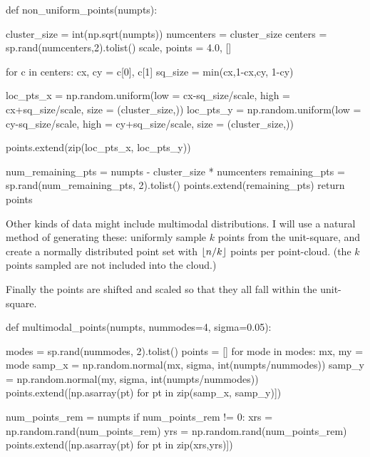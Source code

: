 def non_uniform_points(numpts):

    cluster_size = int(np.sqrt(numpts)) 
    numcenters   = cluster_size
    centers      = sp.rand(numcenters,2).tolist()
    scale, points = 4.0, []

    for c in centers:
        cx, cy = c[0], c[1]
        sq_size      = min(cx,1-cx,cy, 1-cy)

        loc_pts_x    = np.random.uniform(low  = cx-sq_size/scale, 
                                         high = cx+sq_size/scale, 
                                         size = (cluster_size,))
        loc_pts_y    = np.random.uniform(low = cy-sq_size/scale, 
                                         high = cy+sq_size/scale, 
                                         size = (cluster_size,))

        points.extend(zip(loc_pts_x, loc_pts_y))

    num_remaining_pts = numpts - cluster_size * numcenters
    remaining_pts = sp.rand(num_remaining_pts, 2).tolist()
    points.extend(remaining_pts)
    return points
\nwendcode{}\nwdocspar

Other kinds of data might include multimodal distributions. I will use
a natural method of generating these: uniformly sample $k$ points from 
the unit-square, and create a normally distributed point set with 
$\left \lfloor n/k \right \rfloor$ points per point-cloud. (the $k$ points sampled are not included
into the cloud.) 

Finally the points are shifted and scaled so that they all fall within the unit-square.


\nwenddocs{}\endmoddef\nwstartdeflinemarkup{}\nwenddeflinemarkup
def multimodal_points(numpts, nummodes=4, sigma=0.05):
     
     modes  = sp.rand(nummodes, 2).tolist()
     points = [] 
     for mode in modes:
          mx, my = mode
          samp_x = np.random.normal(mx, sigma, int(numpts/nummodes))
          samp_y = np.random.normal(my, sigma, int(numpts/nummodes))
          points.extend([np.asarray(pt) for pt in zip(samp_x, samp_y)])
          
     num_points_rem = numpts%
     if num_points_rem != 0:
          xrs = np.random.rand(num_points_rem)
          yrs = np.random.rand(num_points_rem)
          points.extend([np.asarray(pt) for pt in zip(xrs,yrs)])

